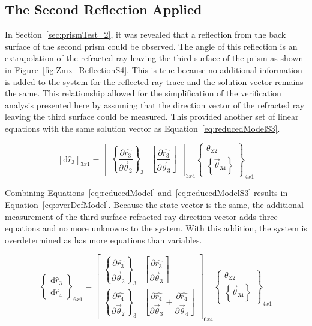 \subsection{The Second Reflection Applied}
In Section~\ref{sec:prismTest_2}, it was revealed that a reflection from the back surface of the second prism could be observed. The angle of this reflection is an extrapolation of the refracted ray leaving the third surface of the prism as shown in Figure~\ref{fig:Zmx_ReflectionS4}. This is true because no additional information is added to the system for the reflected ray-trace and the solution vector remains the same. This relationship allowed for the simplification of the verification analysis presented here by assuming that the direction vector of the refracted ray leaving the third surface could be measured. This provided another set of linear equations with the same solution vector as Equation~\eqref{eq:reducedModelS3}.

\begin{equation}		%
\label{eq:reducedModelS3}
\left [ \textrm{d}\hat{r}_{3} \right ]_{3x1} = 
\left [ 
	\begin{array}{cc}
	\left \{ \dfrac{\partial\hat{r_3}}{\partial\vec{\theta}_2} \right \}_3 & 
	\left [ \dfrac{\partial\hat{r_3}}{\partial\vec{\theta}_3} \right ]
	\end{array}
\right ]_{3x4}
\left \{
	\begin{array}{c}
	\theta_{Z2} \\
	\left \{ \vec{\theta}_{34} \right \}
	\end{array}
\right \}_{4x1}
\end{equation}

Combining Equations~\eqref{eq:reducedModel} and~\eqref{eq:reducedModelS3} results in Equation~\eqref{eq:overDefModel}. Because the state vector is the same, the additional measurement of the third surface refracted ray direction vector adds three equations and no more unknowns to the system. With this addition, the system is overdetermined as has more equations than variables. 

\begin{equation}		%
\label{eq:overDefModel}
\left \{ 
	\begin{array}{c}
	\textrm{d}\hat{r}_{3} \\[5mm]
	\textrm{d}\hat{r}_{4}
	\end{array}
\right \}_{6x1} = 
\left [ 
	\begin{array}{cc}
	\left \{ \dfrac{\partial\hat{r_3}}{\partial\vec{\theta}_2} \right \}_3 & \left [ \dfrac{\partial\hat{r_3}}{\partial\vec{\theta}_3} \right ] \\[5mm]
	\left \{ \dfrac{\partial\hat{r_4}}{\partial\vec{\theta}_2} \right \}_3 & \left [ \dfrac{\partial\hat{r_4}}{\partial\vec{\theta}_3} + \dfrac{\partial\hat{r_4}}{\partial\vec{\theta}_4} \right ]
	\end{array}
\right ]_{6x4}
\left \{
	\begin{array}{c}
	\theta_{Z2} \\[5mm]
	\left \{ \vec{\theta}_{34} \right \}
	\end{array}
\right \}_{4x1}
\end{equation}

